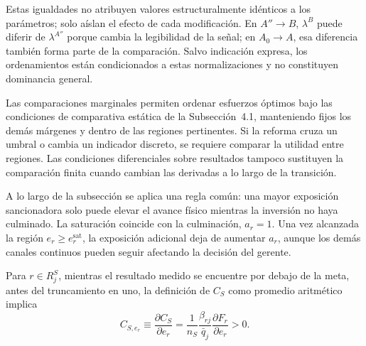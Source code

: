 Estas igualdades no atribuyen valores estructuralmente idénticos a los parámetros; solo aíslan el efecto de cada modificación. En \(A''\to B\), \(\lambda^B\) puede diferir de \(\lambda^{A''}\) porque cambia la legibilidad de la señal; en \(A_0\to A\), esa diferencia también forma parte de la comparación. Salvo indicación expresa, los ordenamientos están condicionados a estas normalizaciones y no constituyen dominancia general.

Las comparaciones marginales permiten ordenar esfuerzos óptimos bajo las condiciones de comparativa estática de la Subsección~4.1, manteniendo fijos los demás márgenes y dentro de las regiones pertinentes. Si la reforma cruza un umbral o cambia un indicador discreto, se requiere comparar la utilidad entre regiones. Las condiciones diferenciales sobre resultados tampoco sustituyen la comparación finita cuando cambian las derivadas a lo largo de la transición.

A lo largo de la subsección se aplica una regla común: una mayor exposición sancionadora solo puede elevar el avance físico mientras la inversión no haya culminado. La saturación coincide con la culminación, \(a_r=1\). Una vez alcanzada la región \(e_r\geq e_r^{\mathrm{sat}}\), la exposición adicional deja de aumentar \(a_r\), aunque los demás canales continuos pueden seguir afectando la decisión del gerente.

Para \(r\in R_j^{S}\), mientras el resultado medido se encuentre por debajo de la meta, antes del truncamiento en uno, la definición de \(C_S\) como promedio aritmético implica
\begin{equation}
\label{eq:derivada_cs_ejecucion}
C_{S,e_r}\equiv\frac{\partial C_S}{\partial e_r}
=\frac{1}{n_S}\frac{\beta_{rj}}{\bar q_j}\frac{\partial F_r}{\partial e_r}>0.
\end{equation}

